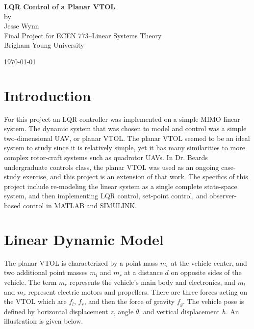 \documentclass[dvips,12pt]{article}
\begin{document}
\begin{titlepage}

\begin{center}

\vspace*{\fill}

\vspace{0.5in}

{ \LARGE \bfseries LQR Control of a Planar VTOL}\\[.25in]

\large
by\\[.25 in]
Jesse Wynn\\[1in]

Final Project for ECEN 773--Linear Systems Theory \\
Brigham Young University \\

\vspace{1in}

\today

\vspace*{\fill}

\end{center}

\end{titlepage}

\section{Introduction}
For this project an LQR controller was implemented on a simple MIMO linear system.  The dynamic system that was chosen to model and control was a simple two-dimensional UAV, or planar VTOL.  The planar VTOL seemed to be an ideal system to study since it is relatively simple, yet it has many similarities to more complex rotor-craft systems such as quadrotor UAVs.  In Dr. Beards undergraduate controls class, the planar VTOL was used as an ongoing case-study exercise, and this project is an extension of that work.  The specifics of this project include re-modeling the linear system as a single complete state-space system, and then implementing LQR control, set-point control, and observer-based control in MATLAB and SIMULINK.  

\section{Linear Dynamic Model}

The planar VTOL is characterized by a point mass $m_c$ at the vehicle center, and two additional point masses $m_l$ and $m_r$ at a distance $d$ on opposite sides of the vehicle.  The term $m_c$ represents the vehicle's main body and electronics, and $m_l$ and $m_r$ represent electric motors and propellers.  There are three forces acting on the VTOL which are $f_l$, $f_r$, and then the force of gravity $f_g$.  The vehicle pose is defined by horizontal displacement $z$, angle $\theta$, and vertical displacement $h$. An illustration is given below.
\end{document}
